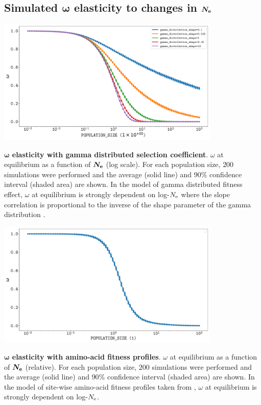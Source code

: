 \documentclass{article}
\begin{document}
\subsection{Simulated $\bm{\omega}$ elasticity to changes in $\bm{N_{\mathrm{e}}}$}
\begin{center}
 \includegraphics[width=0.8\textwidth] {artworks/SimuDfe-Elasticity.pdf}
\end{center}
\textbf{$\bm{\omega}$ elasticity with gamma distributed selection coefficient}.
$\omega$ at equilibrium as a function of $\bm{N_{\mathrm{e}}}$ (log scale).
For each population size, $200$ simulations were performed and the average (solid line) and $90\%$ confidence interval (shaded area) are shown.
In the model of gamma distributed fitness effect, $\omega$ at equilibrium is strongly dependent on log-$N_{\mathrm{e}}$ where the slope correlation is proportional to the inverse of the shape parameter of the gamma distribution \cite{Welch2008}.
\begin{center}
 \includegraphics[width=0.8\textwidth] {artworks/SimuProfile-Elasticity.pdf}
\end{center}
\textbf{$\bm{\omega}$ elasticity with amino-acid fitness profiles}.
$\omega$ at equilibrium as a function of $\bm{N_{\mathrm{e}}}$ (relative).
For each population size, $200$ simulations were performed and the average (solid line) and $90\%$ confidence interval (shaded area) are shown.
In the model of site-wise amino-acid fitness profiles taken from \cite{Bloom2017}, $\omega$ at equilibrium is strongly dependent on log-$N_{\mathrm{e}}$. 
\end{document}
